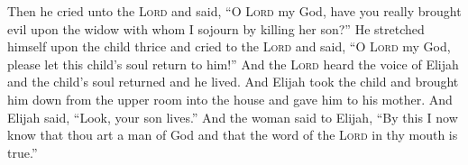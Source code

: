 \begin{enumerate}[align=center]
     Then he cried unto the \textsc{Lord} and said, ``O \textsc{Lord} my God, have you really brought evil upon the widow with whom I sojourn by killing her son?''%
     He stretched himself upon the child thrice and cried to the \textsc{Lord} and said, ``O \textsc{Lord} my God, please let this child's soul return to him!''%
     And the \textsc{Lord} heard the voice of Elijah and the child's soul returned and he lived.%
     And Elijah took the child and brought him down from the upper room into the house and gave him to his mother. And Elijah said, ``Look, your son lives.''%
     And the woman said to Elijah, ``By this I now know that thou art a man of God and that the word of the \textsc{Lord} in thy mouth is true.''%
\end{enumerate}
